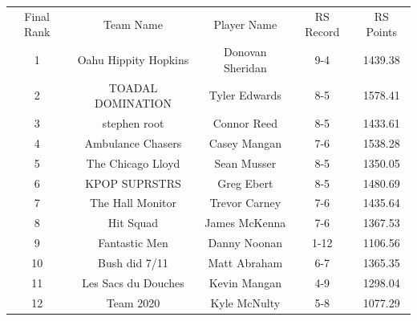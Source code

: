 \documentclass[11pt,letterpaper]{article}
\begin{document}
\vspace{-25pt}
\begin{table} [h]
\begin{center}
\begin{tabular} { c c c c c }
\\ Final Rank & Team Name & Player Name & RS Record & RS Points
\\ 1 & Oahu Hippity Hopkins & Donovan Sheridan & 9-4 & 1439.38
\\ 2 & TOADAL DOMINATION & Tyler Edwards & 8-5 & 1578.41
\\ 3 & stephen root & Connor Reed & 8-5 & 1433.61
\\ 4 & Ambulance Chasers & Casey Mangan & 7-6 & 1538.28
\\ 5 & The Chicago Lloyd & Sean Musser & 8-5 & 1350.05
\\ 6 & KPOP SUPRSTRS & Greg Ebert & 8-5 & 1480.69
\\ 7 & The Hall Monitor & Trevor Carney & 7-6 & 1435.64
\\ 8 & Hit Squad & James McKenna & 7-6 & 1367.53
\\ 9 & Fantastic Men & Danny Noonan & 1-12 & 1106.56
\\ 10 & Bush did 7/11 & Matt Abraham & 6-7 & 1365.35
\\ 11 & Les Sacs du Douches & Kevin Mangan & 4-9 & 1298.04
\\ 12 & Team 2020 & Kyle McNulty & 5-8 & 1077.29
\end{tabular}
\end{center}
\end{table}
\end{document}

